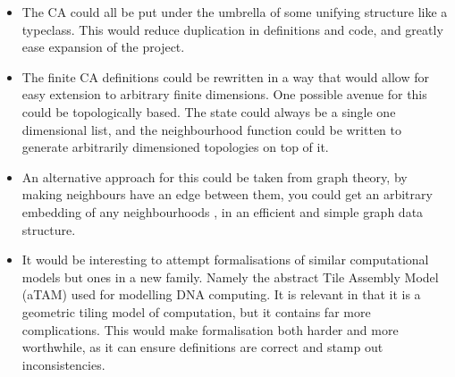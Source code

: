 \begin{itemize}
    \item The CA could all be put under the umbrella of some unifying structure like a typeclass.
        This would reduce duplication in definitions and code,
        and greatly ease expansion of the project.
    \item The finite CA definitions could be rewritten in a way that would allow for easy extension to arbitrary finite dimensions.
        One possible avenue for this could be topologically based.
        The state could always be a single one dimensional list,
        and the neighbourhood function could be written to generate arbitrarily dimensioned topologies on top of it.
    \item An alternative approach for this could be taken from graph theory, 
        by making neighbours have an edge between them,
        you could get an arbitrary embedding of any neighbourhoods \cite{eoin},
        in an efficient and simple graph data structure.
    \item It would be interesting to attempt formalisations of similar computational models but ones in a new family.
        Namely the abstract Tile Assembly Model (aTAM) \cite{doty} used for modelling DNA computing.
        It is relevant in that it is a geometric tiling model of computation,
        but it contains far more complications.
        This would make formalisation both harder and more worthwhile,
        as it can ensure definitions are correct and stamp out inconsistencies.
\end{itemize}
